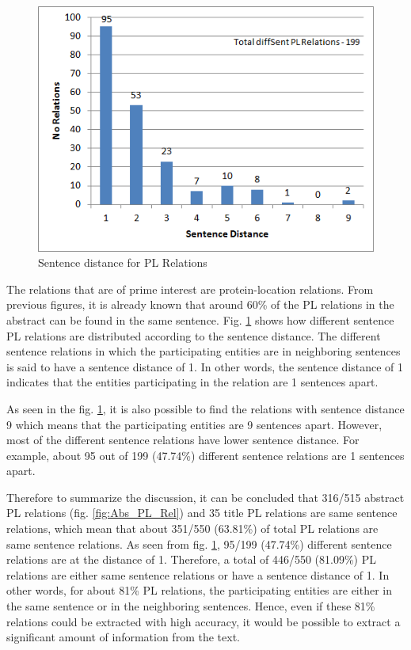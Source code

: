 \begin{figure}
\centering
\includegraphics[scale=0.9]{figures/SentenceDistance_PLRel.png}
\caption{Sentence distance for PL Relations}\label{fig:SentDistancePL}
\end{figure}

The relations that are of prime interest are protein-location relations. From previous figures, it is already known that around 60\% of the PL relations in the abstract can be found in the same sentence. Fig. \ref{fig:SentDistancePL} shows how different sentence PL relations are distributed according to the sentence distance. The different sentence relations in which the participating entities are in neighboring sentences is said to have a sentence distance of 1. In other words, the sentence distance of 1 indicates that the entities participating in the relation are 1 sentences apart. 

As seen in the fig. \ref{fig:SentDistancePL}, it is also possible to find the relations with sentence distance 9 which means that the participating entities are 9 sentences apart. However, most of the different sentence relations have lower sentence distance. For example, about 95 out of 199 (47.74\%) different sentence relations are 1 sentences apart.


Therefore to summarize the discussion, it can be concluded that 316/515 abstract PL relations (fig. \ref{fig:Abs_PL_Rel}) and 35 title PL relations are same sentence relations, which mean that about 351/550 (63.81\%) of total PL relations are same sentence relations. As seen from  fig. \ref{fig:SentDistancePL}, 95/199 (47.74\%) different sentence relations are at the distance of 1. Therefore, a total of 446/550 (81.09\%) PL relations are either same sentence relations or have a sentence distance of 1. In other words, for about 81\% PL relations, the participating entities are either in the same sentence or in the neighboring sentences. Hence, even if these 81\% relations could be extracted with high accuracy, it would be possible to extract a significant amount of information from the text.

